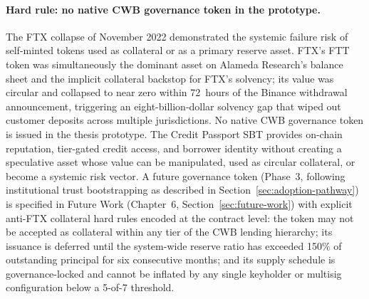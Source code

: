 
\paragraph{Hard rule: no native CWB governance token in the prototype.}
The FTX collapse of November 2022 demonstrated the systemic failure risk of
self-minted tokens used as collateral or as a primary reserve asset. FTX's
FTT token was simultaneously the dominant asset on Alameda Research's balance
sheet and the implicit collateral backstop for FTX's solvency; its value was
circular and collapsed to near zero within 72~hours of the Binance withdrawal
announcement, triggering an eight-billion-dollar solvency gap that wiped out
customer deposits across multiple jurisdictions. No native CWB governance
token is issued in the thesis prototype. The Credit Passport SBT provides
on-chain reputation, tier-gated credit access, and borrower identity without
creating a speculative asset whose value can be manipulated, used as circular
collateral, or become a systemic risk vector. A future governance token
(Phase~3, following institutional trust bootstrapping as described in
Section~\ref{sec:adoption-pathway}) is specified in Future Work
(Chapter~6, Section~\ref{sec:future-work}) with explicit anti-FTX collateral
hard rules encoded at the contract level: the token may not be accepted as
collateral within any tier of the CWB lending hierarchy; its issuance is
deferred until the system-wide reserve ratio has exceeded 150\% of
outstanding principal for six consecutive months; and its supply schedule
is governance-locked and cannot be inflated by any single keyholder or
multisig configuration below a 5-of-7 threshold.

